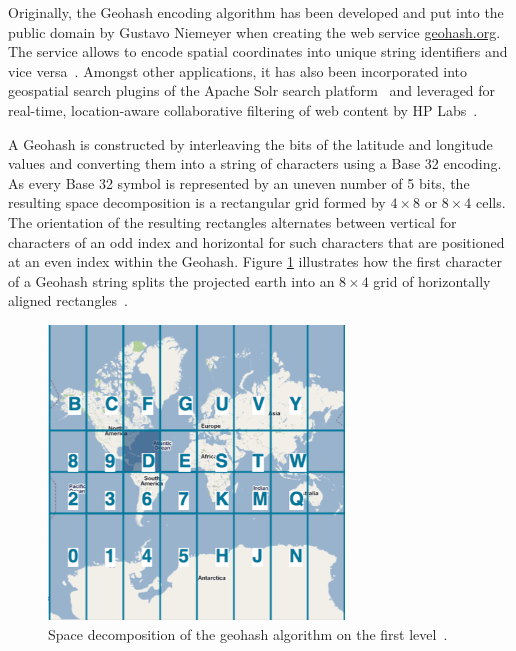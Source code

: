 Originally, the Geohash encoding algorithm has been developed and put into the public domain by Gustavo Niemeyer when creating the web service \href{http://geohash.org}{geohash.org}. The service allows to encode spatial coordinates into unique string identifiers and vice versa~\cite{wiki:geohash}. Amongst other applications, it has also been incorporated into geospatial search plugins of the Apache Solr search platform~\cite{Smiley11geohash} and leveraged for real-time, location-aware collaborative filtering of web content by HP Labs~\cite{Sand11geohashapp}.

A Geohash is constructed by interleaving the bits of the latitude and longitude values and converting them into a string of characters using a Base 32 encoding. As every Base 32 symbol is represented by an uneven number of 5 bits, the resulting  space decomposition is a rectangular grid formed by $4 \times 8$ or $8 \times 4$ cells. The orientation of the resulting rectangles alternates between vertical for characters of an odd index and horizontal for such characters that are positioned at an even index within the Geohash. Figure \ref{fig:geohash} illustrates how the first character of a Geohash string splits the projected earth into an $8 \times 4$ grid of horizontally aligned rectangles~\cite{wiki:geohash, Smiley11geohash}.

\begin{figure}[h]
  \begin{center}
    \includegraphics[width=0.7\textwidth]{figures/geohash_example.png}
    \caption{Space decomposition of the geohash algorithm on the first level~\cite{Smiley11geohash}.}
    \label{fig:geohash}
  \end{center}
\end{figure}

